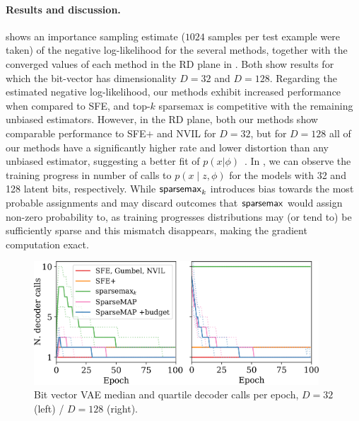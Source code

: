 \paragraph*{Results and discussion.} 
shows an importance sampling estimate ($1024$ samples per test
example were taken) of the negative log-likelihood for the several
methods, together with the converged values of each method in the RD
plane in . Both show results for which the
bit-vector has dimensionality $D=32$ and $D=128$. Regarding the
estimated negative log-likelihood, our methods exhibit increased
performance when compared to SFE, and top-$k$ sparsemax is
competitive with the remaining unbiased estimators. However, in the
RD plane, both our methods show comparable performance to SFE$+$ and
NVIL for $D=32$, but for $D=128$ all of our methods have a
significantly higher rate and lower distortion than any unbiased
estimator, suggesting a better fit of $p(x|\phi)$~\citep{Alemi2018}.
In , we can observe the training progress in
number of calls to $p(x \mid z, \phi)$ for the models with 32 and 128
latent bits, respectively. While $\operatorname{\mathsf{sparsemax}_\text{$k$}}$ introduces bias
towards the most probable assignments and may discard outcomes that
$\operatorname*{\mathsf{sparsemax}}$ would assign non-zero probability to, as training
progresses distributions may (or tend to) be sufficiently sparse and
this mismatch disappears, making the gradient computation exact.

\begin{figure}[htbp]
    \centering
    \includegraphics[width=0.95\textwidth]{Figures/spars.pdf}
    \caption{Bit vector VAE median and quartile decoder calls per
        epoch,
        $D=32$ (left) / $D=128$ (right).\label{fig:structcalls}}
\end{figure}

